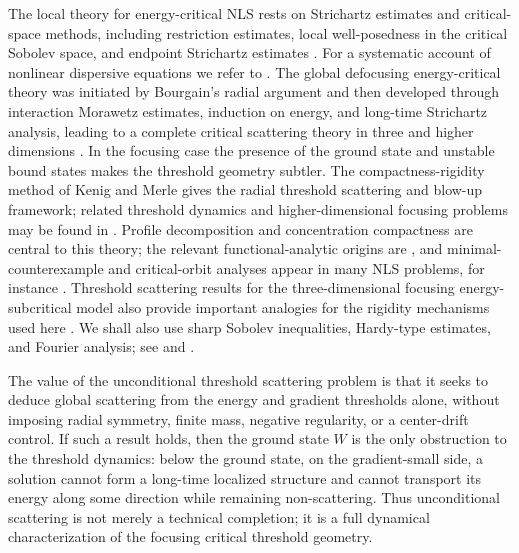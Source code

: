 \documentclass[preprint,12pt]{elsarticle}
\numberwithin{equation}{section}
\theoremstyle{remark}
\begin{document}
The local theory for energy-critical NLS rests on Strichartz estimates and critical-space methods, including restriction estimates, local well-posedness in the critical Sobolev space, and endpoint Strichartz estimates \cite{Strichartz1977,CazenaveWeissler1990,KeelTao1998}.  For a systematic account of nonlinear dispersive equations we refer to \cite{Cazenave2003,Tao2006,LinaresPonce2015}.  The global defocusing energy-critical theory was initiated by Bourgain's radial argument and then developed through interaction Morawetz estimates, induction on energy, and long-time Strichartz analysis, leading to a complete critical scattering theory in three and higher dimensions \cite{Bourgain1999,Visan2007,CollianderKeelStaffilaniTakaokaTao2008}.  In the focusing case the presence of the ground state and unstable bound states makes the threshold geometry subtler.  The compactness-rigidity method of Kenig and Merle gives the radial threshold scattering and blow-up framework; related threshold dynamics and higher-dimensional focusing problems may be found in \cite{KenigMerle2006,DuyckaertsMerle2009,KillipVisan2010,Dodson2019}.  Profile decomposition and concentration compactness are central to this theory; the relevant functional-analytic origins are \cite{Gerard1998,BahouriGerard1999,Keraani2001}, and minimal-counterexample and critical-orbit analyses appear in many NLS problems, for instance \cite{TaoVisanZhang2008}.  Threshold scattering results for the three-dimensional focusing energy-subcritical model also provide important analogies for the rigidity mechanisms used here \cite{HolmerRoudenko2008,DuyckaertsHolmerRoudenko2008}.  We shall also use sharp Sobolev inequalities, Hardy-type estimates, and Fourier analysis; see \cite{Aubin1976,Talenti1976} and \cite{Stein1970,LiebLoss2001,Grafakos2014}.

The value of the unconditional threshold scattering problem is that it seeks to deduce global scattering from the energy and gradient thresholds alone, without imposing radial symmetry, finite mass, negative regularity, or a center-drift control.  If such a result holds, then the ground state $W$ is the only obstruction to the threshold dynamics: below the ground state, on the gradient-small side, a solution cannot form a long-time localized structure and cannot transport its energy along some direction while remaining non-scattering.  Thus unconditional scattering is not merely a technical completion; it is a full dynamical characterization of the focusing critical threshold geometry.
\end{document}
